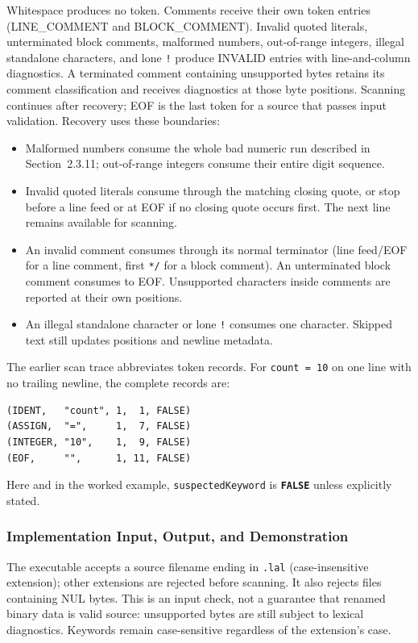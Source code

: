 \documentclass[11pt,a4paper]{article}
\newcommand{\kw}[1]{\texttt{\bfseries\color{pupmaroon}#1}}
\newcommand{\codeinline}[1]{\texttt{#1}}
\begin{document}
Whitespace produces no token. Comments receive their own token entries (LINE\_COMMENT and BLOCK\_COMMENT). Invalid quoted literals, unterminated block comments, malformed numbers, out-of-range integers, illegal standalone characters, and lone \codeinline{!} produce INVALID entries with line-and-column diagnostics. A terminated comment containing unsupported bytes retains its comment classification and receives diagnostics at those byte positions. Scanning continues after recovery; EOF is the last token for a source that passes input validation. Recovery uses these boundaries:
\begin{itemize}
  \item Malformed numbers consume the whole bad numeric run described in Section~2.3.11; out-of-range integers consume their entire digit sequence.
  \item Invalid quoted literals consume through the matching closing quote, or stop before a line feed or at EOF if no closing quote occurs first. The next line remains available for scanning.
  \item An invalid comment consumes through its normal terminator (line feed/EOF for a line comment, first \codeinline{*/} for a block comment). An unterminated block comment consumes to EOF. Unsupported characters inside comments are reported at their own positions.
  \item An illegal standalone character or lone \codeinline{!} consumes one character. Skipped text still updates positions and newline metadata.
\end{itemize}

The earlier scan trace abbreviates token records. For \codeinline{count = 10} on one line with no trailing newline, the complete records are:
\begin{lstlisting}[language={}]
(IDENT,   "count", 1,  1, FALSE)
(ASSIGN,  "=",     1,  7, FALSE)
(INTEGER, "10",    1,  9, FALSE)
(EOF,     "",      1, 11, FALSE)
\end{lstlisting}
Here and in the worked example, \codeinline{suspectedKeyword} is \kw{FALSE} unless explicitly stated.

\subsubsection{Implementation Input, Output, and Demonstration}

The executable accepts a source filename ending in \codeinline{.lal} (case-insensitive extension); other extensions are rejected before scanning. It also rejects files containing NUL bytes. This is an input check, not a guarantee that renamed binary data is valid source: unsupported bytes are still subject to lexical diagnostics. Keywords remain case-sensitive regardless of the extension's case.
\end{document}

